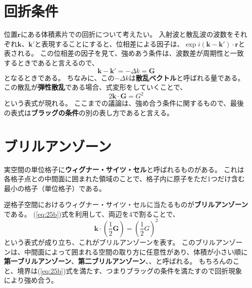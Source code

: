 \documentclass[a4paper]{jsreport}
\begin{document}
        \section{回折条件}
            位置$\boldsymbol{r}$にある体積素片での回折について考えたい。
            入射波と散乱波の波数をそれぞれ$\boldsymbol{k}$、$\boldsymbol{k'}$と表現することにすると、位相差による因子は、$\exp{i(\boldsymbol{k} - \boldsymbol{k'}) \cdot \boldsymbol{r}}$と表される。
            この位相差の因子を見て、強めあう条件は、波数差が周期性と一致するときであると言えるので、
            \begin{equation}
                \boldsymbol{k} - \boldsymbol{k'} = - \Delta k = \boldsymbol{G}
            \end{equation}
            となるときである。
            ちなみに、この$- \Delta k$は\textbf{散乱ベクトル}と呼ばれる量である。
            この散乱が\textbf{弾性散乱}である場合、式変形をしていくことで、
            \begin{equation} \label{eq:25b}
                2 \boldsymbol{k} \cdot \boldsymbol{G} = G^2
            \end{equation}
            という表式が現れる。
            ここまでの議論は、強め合う条件に関するもので、最後の表式は\textbf{ブラッグの条件}の別の表し方であると言える。

        \section{ブリルアンゾーン}
            実空間の単位格子に\textbf{ウィグナー・サイツ・セル}と呼ばれるものがある。
            これは各格子点との中間面に囲まれた領域のことで、格子内に原子をただ1つだけ含む最小の格子（単位格子）である。\par
            逆格子空間におけるウィグナー・サイツ・セルに当たるものが\textbf{ブリルアンゾーン}である。
            (\ref{eq:25b})式を利用して、両辺を$4$で割ることで、
            \begin{equation}
                \boldsymbol{k} \cdot \left(\frac{1}{2} \boldsymbol{G}\right) = \left(\frac{1}{2} G\right)^2
            \end{equation}
            という表式が成り立ち、これがブリルアンゾーンを表す。
            このブリルアンゾーンは、中間面によって囲まれる空間の取り方に任意性があり、体積が小さい順に\textbf{第一ブリルアンゾーン}、\textbf{第二ブリルアンゾーン}、、と呼ばれる。
            もちろんのこと、境界は(\ref{eq:25b})式を満たす、つまりブラッグの条件を満たすので回折現象により強め合う。
\end{document}
